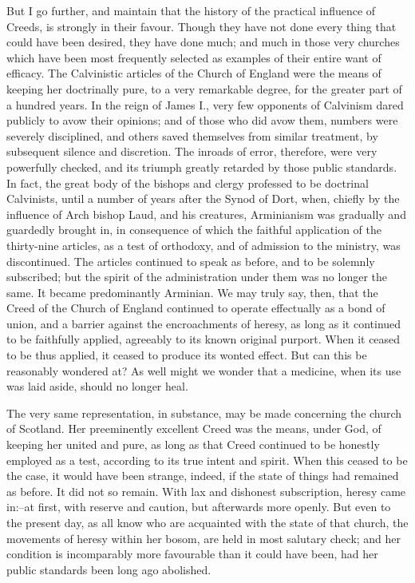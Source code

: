 \documentclass[
]{book}
\begin{document}
But I go further, and maintain that the history of the practical influence of Creeds, is strongly in their favour. Though they have not done every thing that could have been desired, they have done much; and much in those very churches which have been most frequently selected as examples of their entire want of efficacy. The Calvinistic articles of the Church of England were the means of keeping her doctrinally pure, to a very remarkable degree, for the greater part of a hundred years. In the reign of James I., very few opponents of Calvinism dared publicly to avow their opinions; and of those who did avow them, numbers were severely disciplined, and others saved themselves from similar treatment, by subsequent silence and discretion. The inroads of error, therefore, were very powerfully checked, and its triumph greatly retarded by those public standards. In fact, the great body of the bishops and clergy professed to be doctrinal Calvinists, until a number of years after the Synod of Dort, when, chiefly by the influence of Arch bishop Laud, and his creatures, Arminianism was gradually and guardedly brought in, in consequence of which the faithful application of the thirty-nine articles, as a test of orthodoxy, and of admission to the ministry, was discontinued. The articles continued to speak as before, and to be solemnly subscribed; but the spirit of the administration under them was no longer the same. It became predominantly Arminian. We may truly say, then, that the Creed of the Church of England continued to operate effectually as a bond of union, and a barrier against the encroachments of heresy, as long as it continued to be faithfully applied, agreeably to its known original purport. When it ceased to be thus applied, it ceased to produce its wonted effect. But can this be reasonably wondered at? As well might we wonder that a medicine, when its use was laid aside, should no longer heal.

The very same representation, in substance, may be made concerning the church of Scotland. Her preeminently excellent Creed was the means, under God, of keeping her united and pure, as long as that Creed continued to be honestly employed as a test, according to its true intent and spirit. When this ceased to be the case, it would have been strange, indeed, if the state of things had remained as before. It did not so remain. With lax and dishonest subscription, heresy came in:--at first, with reserve and caution, but afterwards more openly. But even to the present day, as all know who are acquainted with the state of that church, the movements of heresy within her bosom, are held in most salutary check; and her condition is incomparably more favourable than it could have been, had her public standards been long ago abolished.
\end{document}
